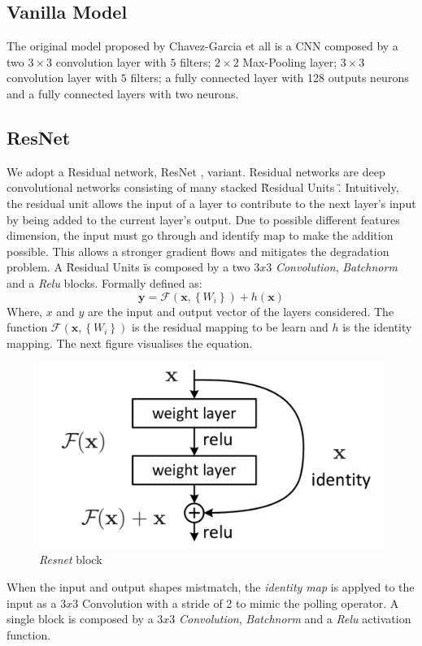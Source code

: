 \documentclass[../document.tex]{subfiles}
\begin{document}
\subsection{Vanilla Model}
The original model proposed by Chavez-Garcia et all \cite{omar2018traversability} is a CNN composed by a two $3 \times 3$ convolution layer with $5$ filters; $2 \times 2$ Max-Pooling layer; $3 \times 3$ convolution layer with $5$ filters; a fully connected layer with 128 outputs neurons and a fully connected layers with two neurons. 
\subsection{ResNet}
We adopt a Residual network, ResNet \cite{he2015deep}, variant. Residual networks are deep convolutional networks consisting of many stacked \" Residual Units \". Intuitively, the residual unit allows the input of a layer to contribute to the next layer's input by being added to the current layer's output. Due to possible different features dimension, the input must go through and identify map to make the addition possible. This allows a stronger gradient flows and mitigates the degradation problem. A \"Residual Units \" is composed by a two $3x3$ \emph{Convolution}, \emph{Batchnorm} \cite{ioffe2015batch} and a \emph{Relu} blocks. Formally defined as: 
\begin{equation}
    \mathbf{y}=\mathcal{F}\left(\mathbf{x},\left\{W_{i}\right\}\right)+h(\mathbf{x})
    \label{eq : resnet}
\end{equation}
Where, $x$ and $y$ are the input and output vector of the layers considered. The function $\mathcal{F}\left(\mathbf{x},\left\{W_{i}\right\}\right)$ is the residual mapping to be learn and $h$ is the identity mapping. The next figure visualises the equation.
\begin{figure}[H]
    \centering
    \includegraphics[scale=0.3]{../img/implementation/estimator/resnet_block.png}
    \caption{\emph{Resnet} block \cite{he2015deep}}
\end{figure}
When the input and output shapes mistmatch, the \emph{identity map} is applyed to the input as a $3x3$ Convolution with a stride of 2 to mimic the polling operator. A single block is composed by a $3x3$ \emph{Convolution}, \emph{Batchnorm} and a \emph{Relu} activation function. 
\end{document}
